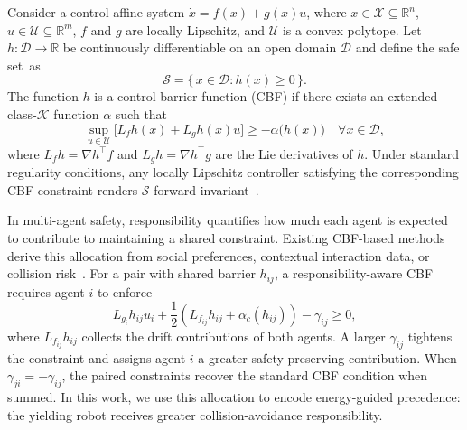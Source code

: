 Consider a control-affine system $\dot{x} = f(x) + g(x)u$, where $x \in \mathcal{X}\subseteq \mathbb{R}^n$, $u\in\mathcal{U}\subseteq\mathbb{R}^m$, $f$ and $g$ are locally Lipschitz, and $\mathcal{U}$ is a convex polytope.
Let $h:\mathcal{D}\rightarrow\mathbb{R}$ be continuously differentiable on an open domain $\mathcal{D}$ and define the safe set~as
\begin{equation}
    \mathcal{S} = \{\, x \in \mathcal{D} : h(x) \ge 0 \,\}.
    \label{eq:safe_set}
\end{equation}
The function $h$ is a control barrier function (CBF) if there exists an extended class-$\mathcal{K}$ function $\alpha$ such that
\begin{equation}
    \sup_{u\in\mathcal{U}}\big[ L_f h(x) + L_g h(x)u \big]\geq -\alpha\big(h(x)\big)
    \quad \forall x \in \mathcal{D},
    \label{eq:cbf_condition}
\end{equation}
where $L_f h = \nabla h^\top f$ and $L_g h = \nabla h^\top g$ are the Lie derivatives of $h$.
Under standard regularity conditions, any locally Lipschitz controller satisfying the corresponding CBF constraint renders $\mathcal{S}$ forward invariant~\cite{ames2019control}.

In multi-agent safety, responsibility quantifies how much each agent is expected to contribute to maintaining a shared constraint.
Existing CBF-based methods derive this allocation from social preferences, contextual interaction data, or collision risk~\cite{lyu2022responsibility, cosner2023learning, remy2025learning, lyu2023risk}.
For a pair with shared barrier $h_{ij}$, a responsibility-aware CBF requires agent $i$ to enforce
\begin{equation}
    L_{g_i} h_{ij} u_i + \frac{1}{2}(L_{f_{ij}}h_{ij} + \alpha_c (h_{ij})) - \gamma_{ij} \geq 0,
    \label{eq:responsibility_cbf}
\end{equation}
where $L_{f_{ij}} h_{ij}$ collects the drift contributions of both agents.
A larger $\gamma_{ij}$ tightens the constraint and assigns agent $i$ a greater safety-preserving contribution.
When $\gamma_{ji}=-\gamma_{ij}$, the paired constraints recover the standard CBF condition when summed.
In this work, we use this allocation to encode energy-guided precedence: the yielding robot receives greater collision-avoidance responsibility.